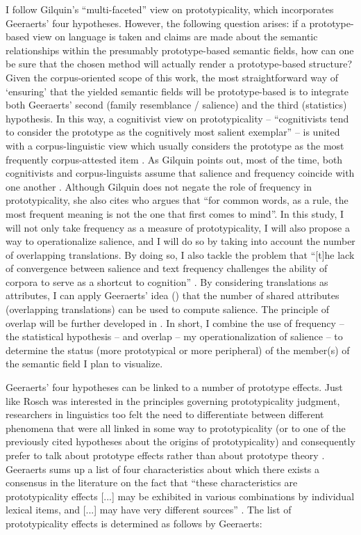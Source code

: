 I follow Gilquin’s “multi-faceted” view on prototypicality, which incorporates Geeraerts' four hypotheses. However, the following question arises: if a prototype-based view on language is taken and claims are made about the semantic relationships within the presumably prototype-based semantic fields, how can one be sure that the chosen method will actually render a prototype-based structure? Given the corpus-oriented scope of this work, the most straightforward way of ‘ensuring’ that the yielded semantic fields will be prototype-based is to integrate both Geeraerts’ second (family resemblance / salience) and the third (statistics) hypothesis. In this way, a cognitivist view on prototypicality – “cognitivists tend to consider the prototype as the cognitively most salient exemplar” \citep[159]{gilquin_place_2006} – is united with a corpus-linguistic view which usually considers the prototype as the most frequently corpus-attested item \citep{gilquin_place_2006}. As Gilquin points out, most of the time, both cognitivists and corpus-linguists assume that salience and frequency coincide with one another \citep{gilquin_place_2006}. Although Gilquin does not negate the role of frequency in prototypicality, she also cites \citet[36]{sinclair_corpus_1991} who argues that “for common words, as a rule, the most frequent meaning is not the one that first comes to mind”. In this study, I will not only take frequency as a measure of prototypicality, I will also propose a way to operationalize salience, and I will do so by taking into account the number of overlapping translations. By doing so, I also tackle the problem that “[t]he lack of convergence between salience and text frequency challenges the ability of corpora to serve as a shortcut to cognition” \citep[9]{arppe_cognitive_2010}. By considering translations as attributes, I can apply Geeraerts' idea (\citeyear[29]{geeraerts_where_2006}) that the number of shared attributes (overlapping translations) can be used to compute salience. The principle of overlap will be further developed in . In short, I combine the use of frequency – the statistical hypothesis – and overlap – my operationalization of salience – to determine the status (more prototypical or more peripheral) of the member(s) of the semantic field I plan to visualize.

Geeraerts’ four hypotheses can be linked to a number of prototype effects. Just like Rosch was interested in the principles governing prototypicality judgment, researchers in linguistics too felt the need to differentiate between different phenomena that were all linked in some way to prototypicality (or to one of the previously cited hypotheses about the origins of prototypicality) and consequently prefer to talk about prototype effects rather than about prototype theory \citep[578]{allan_lexical_2013}. Geeraerts sums up a list of four characteristics about which there exists a consensus in the literature on the fact that “these characteristics are prototypicality effects [...] may be exhibited in various combinations by individual lexical items, and [...] may have very different sources” \citep[578]{allan_lexical_2013}. The list of prototypicality effects is determined as follows by Geeraerts:

